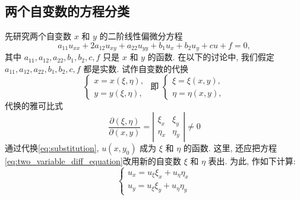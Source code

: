  \subsection{两个自变数的方程分类}
先研究两个自变数 $x$ 和 $y$ 的二阶线性偏微分方程
\begin{equation}
    a_{11} u_{x x}+2 a_{12} u_{x y}+a_{22} u_{y y}+b_1 u_x+b_2 u_y+c u+f=0,
    \label{eq:two_variable_diff_equation}
\end{equation}
其中 $a_{11}, a_{12}, a_{22}, b_1, b_2, c, f$ 只是 $x$ 和 $y$ 的函数. 在以下的讨论中, 我们假定 $a_{11}, a_{12}, a_{22}, b_1, b_2, c, f$ 都是实数.
试作自变数的代换
\begin{equation}
\left\{\begin{array} { l } 
{ x = x ( \xi , \eta ) , } \\
{ y = y ( \xi , \eta ) , }
\end{array} \text { 即 } \left\{\begin{array}{l}
\xi=\xi(x, y), \\
\eta=\eta(x, y),
\end{array}\right.\right.
\label{eq:substitution}
\end{equation}
代换的雅可比式
\begin{equation}
    \frac{\partial(\xi, \eta)}{\partial(x, y)} = \left|\begin{array}{ll}
        \xi_x & \xi_y \\
        \eta_x & \eta_y
        \end{array}\right|
    \neq 0
    \label{eq:jacobian}
\end{equation}
通过代换\eqref{eq:substitution}, $u\left(x, y_0\right)$ 成为 $\xi$ 和 $\eta$ 的函数. 
这里, 还应把方程\eqref{eq:two_variable_diff_equation}改用新的自变数 $\xi$ 和 $\eta$ 表出. 
为此, 作如下计算:
\begin{equation}
    \left\{\begin{array}{l}
        u_x=u_{\xi} \xi_x+u_\eta \eta_x \\
        u_y=u_{\xi} \xi_y+u_\eta \eta_y
        \end{array}\right.
        \label{eq:ux_uy}
\end{equation}

